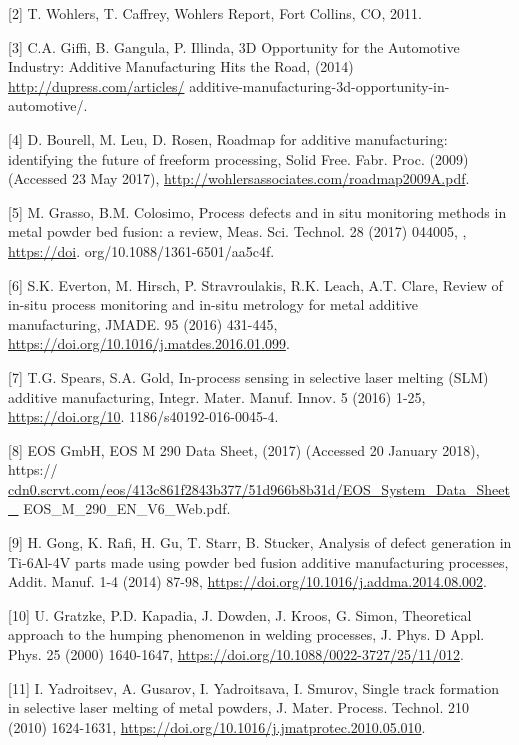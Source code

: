 \documentclass[10pt]{article}
\begin{document}
[2] T. Wohlers, T. Caffrey, Wohlers Report, Fort Collins, CO, 2011.

[3] C.A. Giffi, B. Gangula, P. Illinda, 3D Opportunity for the Automotive Industry: Additive Manufacturing Hits the Road, (2014) \href{http://dupress.com/articles/}{http://dupress.com/articles/} additive-manufacturing-3d-opportunity-in-automotive/.

[4] D. Bourell, M. Leu, D. Rosen, Roadmap for additive manufacturing: identifying the future of freeform processing, Solid Free. Fabr. Proc. (2009) (Accessed 23 May 2017), \href{http://wohlersassociates.com/roadmap2009A.pdf}{http://wohlersassociates.com/roadmap2009A.pdf}.

[5] M. Grasso, B.M. Colosimo, Process defects and in situ monitoring methods in metal powder bed fusion: a review, Meas. Sci. Technol. 28 (2017) 044005, , \href{https://doi}{https://doi}. org/10.1088/1361-6501/aa5c4f.

[6] S.K. Everton, M. Hirsch, P. Stravroulakis, R.K. Leach, A.T. Clare, Review of in-situ process monitoring and in-situ metrology for metal additive manufacturing, JMADE. 95 (2016) 431-445, \href{https://doi.org/10.1016/j.matdes.2016.01.099}{https://doi.org/10.1016/j.matdes.2016.01.099}.

[7] T.G. Spears, S.A. Gold, In-process sensing in selective laser melting (SLM) additive manufacturing, Integr. Mater. Manuf. Innov. 5 (2016) 1-25, \href{https://doi.org/10}{https://doi.org/10}. 1186/s40192-016-0045-4.

[8] EOS GmbH, EOS M 290 Data Sheet, (2017) (Accessed 20 January 2018), https:// \href{http://cdn0.scrvt.com/eos/413c861f2843b377/51d966b8b31d/EOS_System_Data_Sheet_}{cdn0.scrvt.com/eos/413c861f2843b377/51d966b8b31d/EOS\_System\_Data\_Sheet\_} EOS\_M\_290\_EN\_V6\_Web.pdf.

[9] H. Gong, K. Rafi, H. Gu, T. Starr, B. Stucker, Analysis of defect generation in Ti-6Al-4V parts made using powder bed fusion additive manufacturing processes, Addit. Manuf. 1-4 (2014) 87-98, \href{https://doi.org/10.1016/j.addma.2014.08.002}{https://doi.org/10.1016/j.addma.2014.08.002}.

[10] U. Gratzke, P.D. Kapadia, J. Dowden, J. Kroos, G. Simon, Theoretical approach to the humping phenomenon in welding processes, J. Phys. D Appl. Phys. 25 (2000) 1640-1647, \href{https://doi.org/10.1088/0022-3727/25/11/012}{https://doi.org/10.1088/0022-3727/25/11/012}.

[11] I. Yadroitsev, A. Gusarov, I. Yadroitsava, I. Smurov, Single track formation in selective laser melting of metal powders, J. Mater. Process. Technol. 210 (2010) 1624-1631, \href{https://doi.org/10.1016/j.jmatprotec.2010.05.010}{https://doi.org/10.1016/j.jmatprotec.2010.05.010}.
\end{document}

